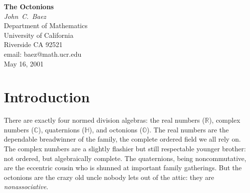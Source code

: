 \documentclass[12pt]{article}
\newcommand\R{{\mathbb R}}
\newcommand\C{{\mathbb C}}
\renewcommand\H{{\mathbb H}}
\renewcommand\O{{\mathbb O}}
\begin{document}
   
 
	\begin{center}   
	{\bf  The Octonions \\}   
	{\em John\ C.\ Baez\\}   
	\vspace{0.3cm}   
	{\small Department of Mathematics \\   
	University of California\\   
        Riverside CA 92521\\}   
        {\small email:  baez@math.ucr.edu\\} 
	\vspace{0.3cm}   
	{May 16, 2001 \\}   
	\vspace{0.3cm}   
	\end{center}   

\begin{abstract} 
\noindent  
The octonions are the largest of the four normed division algebras.
While somewhat neglected due to their nonassociativity, they stand at
the crossroads of many interesting fields of mathematics.  Here we
describe them and their relation to Clifford algebras and spinors, Bott
periodicity, projective and Lorentzian geometry, Jordan algebras, and
the exceptional Lie groups.  We also touch upon their applications in
quantum logic, special relativity and supersymmetry. 
\end{abstract}

\section{Introduction}   
   
There are exactly four normed division algebras: the real numbers  
($\R$), complex numbers ($\C$), quaternions ($\H$), and octonions  
($\O$).  The real numbers are the dependable breadwinner of the family,  
the complete ordered field we all rely on.  The complex numbers are a  
slightly flashier but still respectable younger brother: not ordered,  
but algebraically complete.  The quaternions, being noncommutative, are  
the eccentric cousin who is shunned at important family gatherings.  But  
the octonions are the crazy old uncle nobody lets out of the attic: they  
are {\it nonassociative}.  
   
\end{document}
